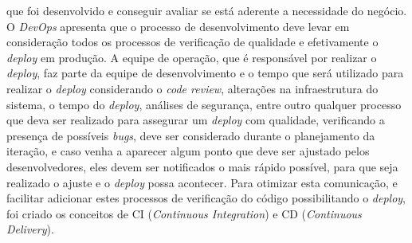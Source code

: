       que foi desenvolvido e conseguir avaliar se está aderente a necessidade do
      negócio. \newline
      O \textit{DevOps} apresenta que o processo de desenvolvimento deve levar em
      consideração todos os processos de verificação de qualidade e efetivamente
      o \textit{deploy} em produção. A equipe de operação, que é responsável por
      realizar o \textit{deploy}, faz parte da equipe de desenvolvimento e o tempo
      que será utilizado para realizar o \textit{deploy} considerando o
      \textit{code review}, alterações na infraestrutura do sistema, o tempo do
      \textit{deploy}, análises de segurança, entre outro qualquer processo que
      deva ser realizado para assegurar um \textit{deploy} com qualidade, verificando
      a presença de possíveis \textit{bugs}, deve ser considerado durante o
      planejamento da iteração, e caso venha a aparecer algum ponto que deve ser
      ajustado pelos desenvolvedores, eles devem ser notificados o mais rápido
      possível, para que seja realizado o ajuste e o \textit{deploy} possa acontecer. \newline
      Para otimizar esta comunicação, e facilitar adicionar estes processos de
      verificação do código possibilitando o \textit{deploy}, foi criado os
      conceitos de CI (\textit{Continuous Integration}) e CD
      (\textit{Continuous Delivery}).

